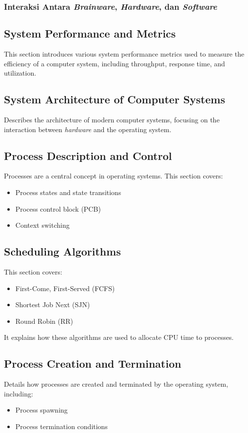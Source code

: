 \documentclass[12pt]{article}
\begin{document}
\subsubsection{Interaksi Antara \textit{Brainware}, \textit{Hardware}, dan \textit{Software}}
\subsection{System Performance and Metrics}
This section introduces various system performance metrics used to measure the efficiency of a computer system, including throughput, response time, and utilization.

\subsection{System Architecture of Computer Systems}
Describes the architecture of modern computer systems, focusing on the interaction between \textit{hardware} and the operating system.

\subsection{Process Description and Control}
Processes are a central concept in operating systems. This section covers:
\begin{itemize}
    \item Process states and state transitions
    \item Process control block (PCB)
    \item Context switching
\end{itemize}

\subsection{Scheduling Algorithms}
This section covers:
\begin{itemize}
    \item First-Come, First-Served (FCFS)
    \item Shortest Job Next (SJN)
    \item Round Robin (RR)
\end{itemize}
It explains how these algorithms are used to allocate CPU time to processes.

\subsection{Process Creation and Termination}
Details how processes are created and terminated by the operating system, including:
\begin{itemize}
    \item Process spawning
    \item Process termination conditions
\end{itemize}
\end{document}
